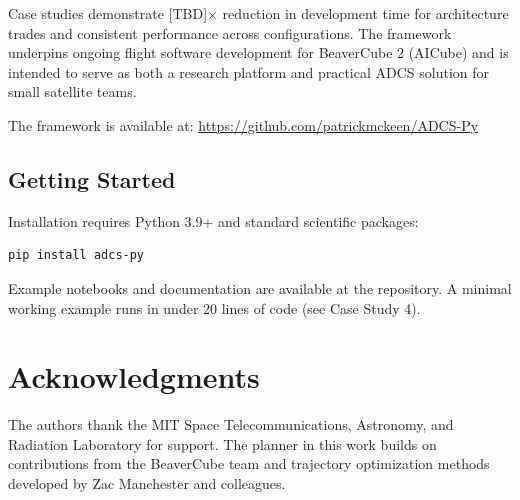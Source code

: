 \documentclass[conference]{IEEEtran}
\begin{document}
Case studies demonstrate [TBD]$\times$ reduction in development time for architecture trades and consistent performance across configurations. The framework underpins ongoing flight software development for BeaverCube 2 (AICube) and is intended to serve as both a research platform and practical ADCS solution for small satellite teams.

The framework is available at: \url{https://github.com/patrickmckeen/ADCS-Py}

\subsection*{Getting Started}
Installation requires Python 3.9+ and standard scientific packages:
\begin{lstlisting}[language=bash]
pip install adcs-py
\end{lstlisting}
Example notebooks and documentation are available at the repository. A minimal working example runs in under 20 lines of code (see Case Study 4).

\section*{Acknowledgments}
The authors thank the MIT Space Telecommunications, Astronomy, and Radiation Laboratory for support. The planner in this work builds on contributions from the BeaverCube team and trajectory optimization methods developed by Zac Manchester and colleagues.



\end{document}
